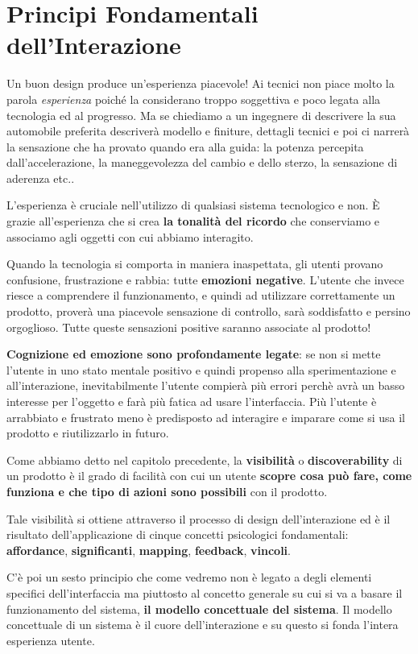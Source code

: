 \chapter{Principi Fondamentali dell'Interazione}
Un buon design produce un'esperienza piacevole! Ai tecnici non piace molto la parola \textit{esperienza} poiché la considerano troppo soggettiva e poco
legata alla tecnologia ed al progresso. Ma se chiediamo a un ingegnere di descrivere la sua automobile preferita descriverà modello e finiture,
dettagli tecnici e poi ci narrerà la sensazione che ha provato quando era alla guida: la potenza percepita dall'accelerazione, la maneggevolezza del
cambio e dello sterzo, la sensazione di aderenza etc..

L'esperienza è cruciale nell'utilizzo di qualsiasi sistema tecnologico e non. \`E grazie all'esperienza che si crea \textbf{la tonalità del ricordo}
che conserviamo e associamo agli oggetti con cui abbiamo interagito.

Quando la tecnologia si comporta in maniera inaspettata, gli utenti provano confusione, frustrazione e rabbia: tutte \textbf{emozioni negative}. L'utente
che invece riesce a comprendere il funzionamento, e quindi ad utilizzare correttamente un prodotto, proverà una piacevole sensazione di controllo, sarà
soddisfatto e persino orgoglioso. Tutte queste sensazioni positive saranno associate al prodotto!

\textbf{Cognizione ed emozione sono profondamente legate}: se non si mette l'utente in uno stato mentale positivo e quindi propenso alla sperimentazione
e all'interazione, inevitabilmente l'utente compierà più errori perchè avrà un basso interesse per l'oggetto e farà più fatica ad usare l'interfaccia.
Più l'utente è arrabbiato e frustrato meno è predisposto ad interagire e imparare come si usa il prodotto e riutilizzarlo in futuro.

Come abbiamo detto nel capitolo precedente, la \textbf{visibilità} o \textbf{discoverability} di un prodotto è il grado di facilità con cui un utente
\textbf{scopre cosa può fare, come funziona e che tipo di azioni sono possibili} con il prodotto. 

Tale visibilità si ottiene attraverso il processo di design dell'interazione ed è il risultato dell'applicazione di cinque concetti psicologici
fondamentali:
\textbf{affordance},
\textbf{significanti},
\textbf{mapping},
\textbf{feedback},
\textbf{vincoli}.

C'è poi un sesto principio che come vedremo non è legato a degli elementi specifici dell'interfaccia ma piuttosto al concetto generale su cui si va a
basare il funzionamento del sistema, \textbf{il modello concettuale del sistema}. Il modello concettuale di un sistema è il cuore dell'interazione e su
questo si fonda l'intera esperienza utente.


